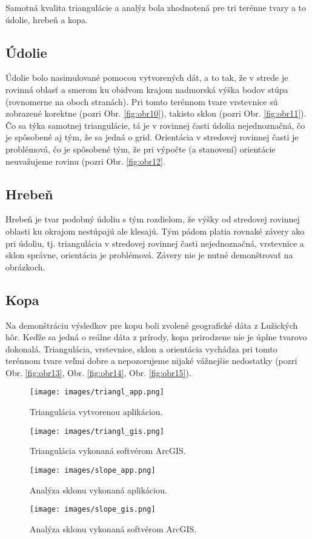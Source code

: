 \documentclass[11pt]{article}
\begin{document}
Samotná kvalita triangulácie a analýz bola zhodnotená pre tri terénne tvary a to údolie, hrebeň a kopa.
\subsection{Údolie}
Údolie bolo nasimulované pomocou vytvorených dát, a to tak, že v strede je rovinná oblasť a smerom ku obidvom krajom nadmorská výška bodov stúpa (rovnomerne na oboch stranách). Pri tomto terénnom tvare vrstevnice sú zobrazené korektne (pozri Obr. \ref{fig:obr10}), takisto sklon (pozri Obr. \ref{fig:obr11}). Čo sa týka samotnej triangulácie, tá je v rovinnej časti údolia nejednoznačná, čo je spôsobené aj tým, že sa jedná o grid. Orientácia v stredovej rovinnej časti je problémová, čo je spôsobené tým, že pri výpočte (a stanovení) orientácie neuvažujeme rovinu (pozri Obr. \ref{fig:obr12}.

\subsection{Hrebeň}
Hrebeň je tvar podobný údoliu s tým rozdielom, že výšky od stredovej rovinnej oblasti ku okrajom nestúpajú ale klesajú. Tým pádom platia rovnaké závery ako pri údoliu, tj. triangulácia v stredovej rovinnej časti nejednoznačná, vrstevnice a sklon správne, orientácia je problémová. Závery nie je nutné demonštrovať na obrázkoch.
\newpage
\subsection{Kopa}
Na demonštráciu výsledkov pre kopu boli zvolené geografické dáta z Lužických hôr. Keďže sa jedná o reálne dáta z prírody, kopa prirodzene nie je úplne tvarovo dokonalá. Triangulácia, vrstevnice, sklon a orientácia vychádza pri tomto terénnom tvare veľmi dobre a nepozorujeme nijaké vážnejšie nedostatky (pozri Obr. \ref{fig:obr13}, Obr. \ref{fig:obr14}, Obr. \ref{fig:obr15}).


\begin{figure}[htbp]
\captionsetup{justification=centering}
\centering
\texttt{[image: images/triangl\_app.png]}
\caption{Triangulácia vytvorenou aplikáciou.}
\label{fig:obr2}

\bigskip

\texttt{[image: images/triangl\_gis.png]}
\caption{Triangulácia vykonaná softvérom ArcGIS.}
\label{fig:obr3}
\end{figure}


\begin{figure}[htbp]
\captionsetup{justification=centering}
\centering
\texttt{[image: images/slope\_app.png]}
\caption{Analýza sklonu vykonaná aplikáciou.}
\label{fig:obr4}

\bigskip

\texttt{[image: images/slope\_gis.png]}
\caption{Analýza sklonu vykonaná softvérom ArcGIS.}
\label{fig:obr5}
\end{figure}
\end{document}
